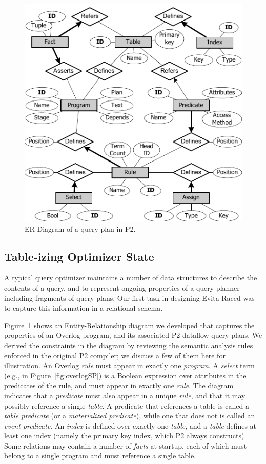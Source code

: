 \begin{figure}
\begin{center}
\includegraphics{figures/ERDiagram}
\caption{{ER Diagram of a query plan in P2.}}
\label{fig:p2er}
\end{center}
\end{figure}
\subsection{Table-izing Optimizer State}
A typical query optimizer maintains a number of data structures to describe the contents 
of a query, and to represent ongoing properties of a query planner including fragments of 
query plans.  Our first task in designing Evita Raced was to capture this information in a 
relational schema.

Figure~\ref{fig:p2er} shows an Entity-Relationship diagram we developed that captures the 
properties of an Overlog program, and its associated P2 dataflow query plans. 
We derived the constraints in the diagram by reviewing the semantic analysis rules enforced 
in the original P2 compiler; we discuss a few of them here for illustration.
An Overlog {\em rule} must appear in exactly one {\em program}. A {\em select} 
term (e.g.,  in Figure~\ref{fig:overlogSP}) is a Boolean expression 
over attributes in the predicates of the rule, and must appear in exactly one {\em rule}.  
The diagram indicates that a {\em predicate} must also appear in a unique {\em rule}, and 
that it may possibly reference a single {\em table}. A predicate that references a table is called 
a {\em table predicate} (or a \emph{materialized predicate}), while one that does not is called 
an {\em event predicate}. An {\em index} is defined over exactly one {\em table}, and a {\em table} 
defines at least one index (namely the primary key index, which P2 always
constructs). Some relations may contain a number of {\em facts} at startup, 
each of which must belong to a single program and must reference a single table.

